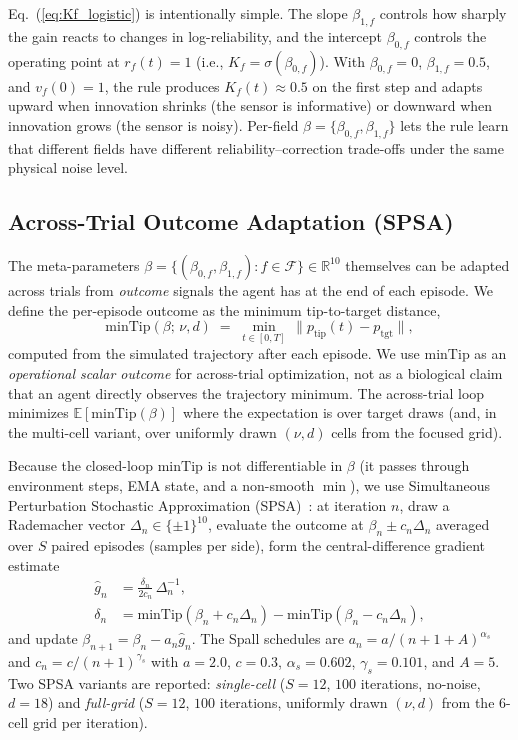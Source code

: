 \documentclass[sn-mathphys,NameDate,iicol]{sn-jnl}
\begin{document}
Eq.~(\ref{eq:Kf_logistic}) is intentionally simple. The slope
$\beta_{1,f}$ controls how sharply the gain reacts to changes in
log-reliability, and the intercept $\beta_{0,f}$ controls the
operating point at $r_f(t)\!=\!1$ (i.e., $K_f\!=\!\sigma(\beta_{0,f})$).
With $\beta_{0,f}\!=\!0$, $\beta_{1,f}\!=\!0.5$, and $v_f(0)\!=\!1$,
the rule produces $K_f(t)\!\approx\!0.5$ on the first step and
adapts upward when innovation shrinks (the sensor is informative) or
downward when innovation grows (the sensor is noisy). Per-field
$\beta\!=\!\{\beta_{0,f}, \beta_{1,f}\}$ lets the rule learn that
different fields have different reliability--correction trade-offs
under the same physical noise level.

\subsection{Across-Trial Outcome Adaptation (SPSA)}
\label{sec:method-spsa}
The meta-parameters $\beta\!=\!\{(\beta_{0,f}, \beta_{1,f}):
f\!\in\!\mathcal{F}\}\!\in\!\mathbb{R}^{10}$ themselves can be
adapted across trials from \emph{outcome} signals the agent has at
the end of each episode. We define the per-episode outcome as the
minimum tip-to-target distance,
\begin{equation}
\mathrm{minTip}(\beta;\,\nu,d) \;=\;
 \min_{t\in[0,T]}\,\|p_{\mathrm{tip}}(t) - p_{\mathrm{tgt}}\|,
\label{eq:outcome}
\end{equation}
computed from the simulated trajectory after each episode. We use
$\mathrm{minTip}$ as an \emph{operational scalar outcome} for
across-trial optimization, not as a biological claim that an agent
directly observes the trajectory minimum. The across-trial loop minimizes
$\mathbb{E}[\mathrm{minTip}(\beta)]$ where the expectation is over
target draws (and, in the multi-cell variant, over uniformly drawn
$(\nu, d)$ cells from the focused grid).

Because the closed-loop $\mathrm{minTip}$ is not differentiable in
$\beta$ (it passes through environment steps, EMA state, and a non-smooth
$\min$), we use Simultaneous Perturbation Stochastic Approximation
(SPSA)~\cite{spall1992spsa}: at iteration $n$, draw a Rademacher
vector $\Delta_n\!\in\!\{\pm 1\}^{10}$, evaluate the outcome at
$\beta_n \pm c_n \Delta_n$ averaged over $S$ paired episodes
(samples per side), form the central-difference gradient estimate
\begin{equation}
\begin{aligned}
\hat g_n
 &= \frac{\delta_n}{2 c_n}\,\Delta_n^{-1},\\
\delta_n
 &= \mathrm{minTip}(\beta_n + c_n\Delta_n)
  - \mathrm{minTip}(\beta_n - c_n\Delta_n),
\end{aligned}
\label{eq:spsa_grad}
\end{equation}
and update $\beta_{n+1} \!=\! \beta_n - a_n \hat g_n$. The Spall
schedules are $a_n \!=\! a / (n{+}1{+}A)^{\alpha_s}$ and
$c_n \!=\! c / (n{+}1)^{\gamma_s}$ with $a{=}2.0$, $c{=}0.3$,
$\alpha_s{=}0.602$, $\gamma_s{=}0.101$, and $A{=}5$. Two SPSA
variants are reported: \emph{single-cell} ($S{=}12$, $100$
iterations, no-noise, $d{=}18$) and \emph{full-grid}
($S{=}12$, $100$ iterations, uniformly drawn $(\nu,d)$ from the
$6$-cell grid per iteration).
\end{document}
